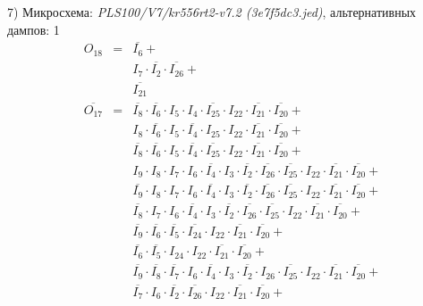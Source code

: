 \documentclass[a4paper,russian]{report}
\begin{document}
7) Микросхема: \emph{PLS100/V7/kr556rt2-v7.2  (3e7f5dc3.jed)}, альтернативных дампов: 1
\nopagebreak\begin{eqnarray*}
    O_{18} & = & \overline{I_{6}} + \\
	& &  I_{7} \cdotp \overline{I_{2}} \cdotp \overline{I_{26}} + \\
	& &  \overline{I_{21}} \\
    \overline{O_{17}} & = & \overline{I_{8}} \cdotp \overline{I_{6}} \cdotp I_{5} \cdotp I_{4} \cdotp \overline{I_{25}} \cdotp I_{22} \cdotp \overline{I_{21}} \cdotp \overline{I_{20}} + \\
	& &  I_{8} \cdotp \overline{I_{6}} \cdotp I_{5} \cdotp \overline{I_{4}} \cdotp I_{25} \cdotp I_{22} \cdotp \overline{I_{21}} \cdotp \overline{I_{20}} + \\
	& &  \overline{I_{8}} \cdotp \overline{I_{6}} \cdotp I_{5} \cdotp \overline{I_{4}} \cdotp \overline{I_{25}} \cdotp I_{22} \cdotp \overline{I_{21}} \cdotp \overline{I_{20}} + \\
	& &  I_{9} \cdotp I_{8} \cdotp I_{7} \cdotp I_{6} \cdotp \overline{I_{4}} \cdotp I_{3} \cdotp \overline{I_{2}} \cdotp \overline{I_{26}} \cdotp \overline{I_{25}} \cdotp I_{22} \cdotp \overline{I_{21}} \cdotp \overline{I_{20}} + \\
	& &  \overline{I_{9}} \cdotp I_{8} \cdotp I_{7} \cdotp I_{6} \cdotp \overline{I_{4}} \cdotp I_{3} \cdotp \overline{I_{2}} \cdotp \overline{I_{26}} \cdotp \overline{I_{25}} \cdotp I_{22} \cdotp \overline{I_{21}} \cdotp \overline{I_{20}} + \\
	& &  \overline{I_{8}} \cdotp I_{7} \cdotp I_{6} \cdotp \overline{I_{4}} \cdotp I_{3} \cdotp \overline{I_{2}} \cdotp \overline{I_{26}} \cdotp \overline{I_{25}} \cdotp I_{22} \cdotp \overline{I_{21}} \cdotp \overline{I_{20}} + \\
	& &  \overline{I_{9}} \cdotp \overline{I_{6}} \cdotp \overline{I_{5}} \cdotp \overline{I_{24}} \cdotp I_{22} \cdotp \overline{I_{21}} \cdotp \overline{I_{20}} + \\
	& &  \overline{I_{6}} \cdotp \overline{I_{5}} \cdotp I_{24} \cdotp I_{22} \cdotp \overline{I_{21}} \cdotp \overline{I_{20}} + \\
	& &  \overline{I_{9}} \cdotp \overline{I_{8}} \cdotp \overline{I_{7}} \cdotp I_{6} \cdotp \overline{I_{4}} \cdotp I_{3} \cdotp \overline{I_{2}} \cdotp I_{26} \cdotp \overline{I_{25}} \cdotp I_{22} \cdotp \overline{I_{21}} \cdotp \overline{I_{20}} + \\
	& &  \overline{I_{7}} \cdotp I_{6} \cdotp \overline{I_{2}} \cdotp \overline{I_{26}} \cdotp I_{22} \cdotp \overline{I_{21}} \cdotp \overline{I_{20}} + \\

\end{eqnarray*}
\end{document}
